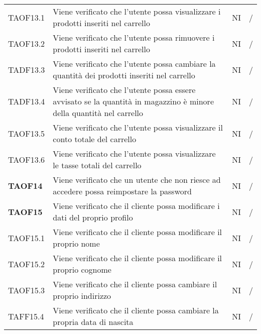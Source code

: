 \begin{center}
\begin{longtable}[!h]{p{60px} p{240px} p{35px} p{35px}}
        TAOF13.1        & Viene verificato che l'utente possa visualizzare i prodotti inseriti nel carrello                                   & NI              & /              \\
        TAOF13.2        & Viene verificato che l'utente possa rimuovere i prodotti inseriti nel carrello                                      & NI              & /              \\
        TADF13.3        & Viene verificato che l'utente possa cambiare la quantità dei prodotti inseriti nel carrello                         & NI              & /              \\
        TADF13.4        & Viene verificato che l'utente possa essere avvisato se la quantità in magazzino è minore della quantità nel carrello      & NI              & /              \\
        TAOF13.5        & Viene verificato che l'utente possa visualizzare il conto totale del carrello                                       & NI              & /              \\
        TAOF13.6        & Viene verificato che l'utente possa visualizzare le tasse totali del carrello                                       & NI              & /              \\
        \textbf{TAOF14} & Viene verificato che un utente che non riesce ad accedere possa reimpostare la password                             & NI              & /              \\
        \textbf{TAOF15} & Viene verificato che il cliente possa modificare i dati del proprio profilo                                         & NI              & /              \\
        TAOF15.1        & Viene verificato che il cliente possa modificare il proprio nome                                                    & NI              & /              \\
        TAOF15.2        & Viene verificato che il cliente possa modificare il proprio cognome                                                 & NI              & /              \\
        TAOF15.3        & Viene verificato che il cliente possa cambiare il proprio indirizzo                                                 & NI              & /              \\
        TAFF15.4        & Viene verificato che il cliente possa cambiare la propria data di nascita                                           & NI              & /              \\

\end{longtable}
\end{center}
